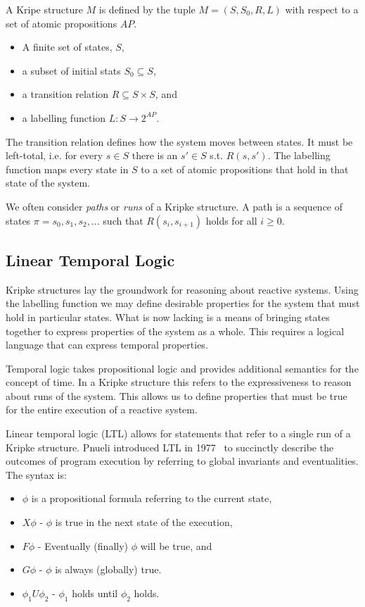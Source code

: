 A Kripe structure $M$ is defined by the tuple $M = (S, S_0, R, L)$ with respect
to a set of atomic propositions $AP$.

\begin{itemize}
    \item A finite set of states, $S$,
    \item a subset of initial stats $S_0 \subseteq S$,
    \item a transition relation $R \subseteq S \times S$, and
    \item a labelling function $L : S \to 2^{AP}$.
\end{itemize}

The transition relation defines how the system moves between states. It must be
left-total, i.e. for every $s \in S$ there is an $s' \in S$ s.t. $R(s, s')$.
The labelling function maps every state in $S$ to a set of atomic propositions
that hold in that state of the system.

We often consider \emph{paths} or \emph{runs} of a Kripke structure. A path is
a sequence of states $\pi = s_0, s_1, s_2, ...$ such that $R(s_i, s_{i+1})$
holds for all $i \geq 0$.

\subsection{Linear Temporal Logic}

Kripke structures lay the groundwork for reasoning about reactive systems. Using the labelling function we may define desirable properties for the system that must hold in particular states. What is now lacking is a means of bringing states together to express properties of the system as a whole. This requires a logical language that can express temporal properties.

Temporal logic takes propositional logic and provides additional semantics for
the concept of time. In a Kripke structure this refers to the expressiveness to
reason about runs of the system. This allows us to define properties that must
be true for the entire execution of a reactive system.

Linear temporal logic (LTL) allows for statements that refer to a single run of
a Kripke structure. Pnueli introduced LTL in 1977~\cite{Pnueli77} to succinctly
describe the outcomes of program execution by referring to global invariants
and eventualities. The syntax is:

\begin{itemize}
    \item $\phi$ is a propositional formula referring to the current state,
    \item $X\phi$ - $\phi$ is true in the next state of the execution,
    \item $F\phi$ - Eventually (finally) $\phi$ will be true, and
    \item $G\phi$ - $\phi$ is always (globally) true.
    \item $\phi_1 U \phi_2$ - $\phi_1$ holds until $\phi_2$ holds.
\end{itemize}

